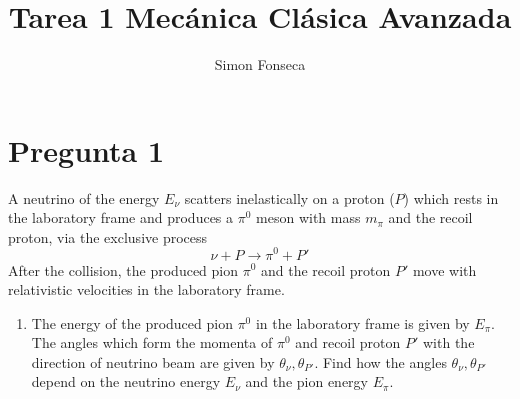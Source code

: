 \documentclass[]{article}
\title{Tarea 1 Mecánica Clásica Avanzada}
\author{Simon Fonseca}
\numberwithin{equation}{section}
\newcommand{\0}{\textcolor{gray}{0}}
\begin{document}
\maketitle
\section{Pregunta 1}
A neutrino of the energy \(E_\nu\) scatters inelastically on a proton (\(P\)) which rests in the laboratory frame and produces a \(\pi^0\) meson with mass \(m_\pi\) and the recoil proton, via the exclusive process
\begin{equation}
	\nu + P \rightarrow \pi^0 + P'
\end{equation}
After the collision, the produced pion \(\pi^0\) and the recoil proton \(P'\) move with relativistic velocities in the laboratory frame.


\begin{enumerate}
	\item[\textbf{a.}] The energy of the produced pion \(\pi^0\) in the laboratory frame is given by \(E_\pi\). The angles which form the momenta of \(\pi^0\) and recoil proton \(P'\) with the direction of neutrino beam are given by \(\theta_\nu,\theta_{P'}\). Find how the angles \(\theta_\nu,\theta_{P'}\) depend on the neutrino energy \(E_\nu\) and the pion energy \(E_\pi\).
\end{enumerate}
\end{document}
